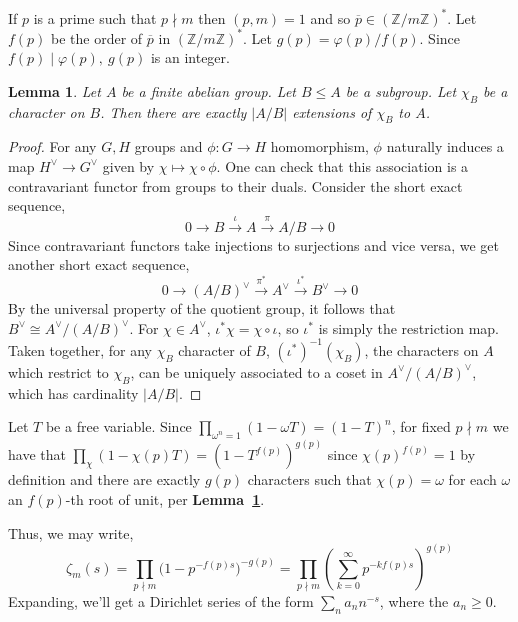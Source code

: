\documentclass[12pt]{article}
\newcommand{\ints}{\mathbb{Z}}
\newcommand{\intsmod}[1]{\ints / #1 \ints}
\newcommand{\lref}[1]{\textbf{Lemma~\ref{#1}}}
\newtheorem{lemma}{Lemma}
\numberwithin{equation}{section}
\numberwithin{thm}{section}
\numberwithin{lemma}{section}
\numberwithin{cor}{section}
\begin{document}
If $p$ is a prime such that $p \nmid m$ then $(p, m) = 1$ and so $\overline{p} \in (\intsmod{m})^*$. Let $f(p)$ be the order of $\overline{p}$ in $(\intsmod{m})^*$. Let $g(p) = \varphi(p)/f(p)$. Since $f(p) \mid \varphi(p) , \ g(p)$ is an integer.

\begin{lemma}\label{CharacterExtensions}
  Let $A$ be a finite abelian group. Let $B \leq A$ be a subgroup. Let $\chi_B$ be a character on $B$. Then there are exactly $|A/B|$ extensions of $\chi_B$ to $A$.
\end{lemma}
\begin{proof}
  For any $G, H$ groups and $\phi: G \to H$ homomorphism, $\phi$ naturally induces a map $H^{\vee} \to G^{\vee}$ given by $\chi \mapsto \chi \circ \phi$. One can check that this association is a contravariant functor from groups to their duals. Consider the short exact sequence, \begin{equation*}
    0 \to B \overset{\iota}{\to} A \overset{\pi}{\to} A/B \to 0
  \end{equation*} Since contravariant functors take injections to surjections and vice versa, we get another short exact sequence, \begin{equation*}
  0 \to (A/B)^{\vee} \overset{\pi^*}{\to} A^{\vee} \overset{\iota^*}{\to} B^{\vee} \to 0 
\end{equation*} By the universal property of the quotient group, it follows that $B^{\vee} \cong A^{\vee} / (A/B)^{\vee}$. For $\chi \in A^{\vee}$, $\iota^* \chi = \chi \circ \iota$, so $\iota^*$ is simply the restriction map. Taken together, for any $\chi_B$ character of $B$, $(\iota^*)^{-1}(\chi_B)$, the characters on $A$ which restrict to $\chi_B$, can be uniquely associated to a coset in $A^{\vee} /(A/B)^{\vee}$, which has cardinality $|A/B|$.
\end{proof} 

Let $T$ be a free variable. Since $\prod_{\omega^n = 1} (1 - \omega T) = (1 - T)^n$, for fixed $p \nmid m$ we have that $\prod_{\chi} (1 - \chi(p)T) = (1 - T^{f(p)})^{g(p)}$ since $\chi(p)^{f(p)} = 1$ by definition and there are exactly $g(p)$ characters such that $\chi(p) = \omega$ for each $\omega$ an $f(p)$-th root of unit, per \lref{CharacterExtensions}. 

Thus, we may write, \begin{equation*}
  \zeta_m(s) = \prod_{p \nmid m} \Big( 1 - p^{-f(p)s} \Big)^{-g(p)} = \prod_{p \nmid m} \left( \sum_{k=0}^{\infty} p^{-k f(p)s} \right)^{g(p)}
\end{equation*} Expanding, we'll get a Dirichlet series of the form $\sum_n a_n n^{-s}$, where the $a_n \geq 0$.
\end{document}
